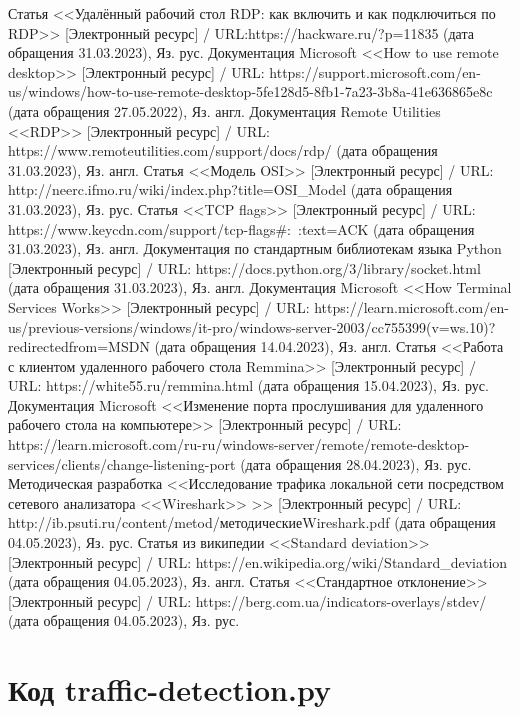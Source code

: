 \documentclass[bachelor, och, coursework]{SCWorks}
\begin{document}
  \begin{thebibliography}{15}
    Статья <<Удалённый рабочий стол RDP: как включить и как подключиться по RDP>> [Электронный ресурс] / URL:https://hackware.ru/?p=11835 (дата обращения 31.03.2023), Яз. рус.
    Документация Microsoft <<How to use remote desktop>> [Электронный ресурс] / URL: https://support.microsoft.com/en-us/windows/how-to-use-remote-desktop-5fe128d5-8fb1-7a23-3b8a-41e636865e8c (дата обращения 27.05.2022), Яз. англ.
    Документация Remote Utilities <<RDP>> [Электронный ресурс] / URL:  https://www.remoteutilities.com/support/docs/rdp/ (дата обращения 31.03.2023), Яз. англ.
    Статья <<Модель OSI>> [Электронный ресурс] / URL: http://neerc.ifmo.ru/wiki/index.php?title=OSI_Model (дата обращения 31.03.2023), Яз. рус.
    Статья <<TCP flags>> [Электронный ресурс] / URL: https://www.keycdn.com/support/tcp-flags\#:~:text=ACK
    (дата обращения 31.03.2023), Яз. англ.
    Документация по стандартным библиотекам языка Python [Электронный ресурс] / URL: https://docs.python.org/3/library/socket.html (дата обращения 31.03.2023), Яз. англ.
    Документация Microsoft <<How Terminal Services Works>> [Электронный ресурс] / URL:  https://learn.microsoft.com/en-us/previous-versions/windows/it-pro/windows-server-2003/cc755399(v=ws.10)?redirectedfrom=MSDN (дата обращения 14.04.2023), Яз. англ.
    Статья <<Работа с клиентом удаленного рабочего стола Remmina>> [Электронный ресурс] / URL: https://white55.ru/remmina.html
    (дата обращения 15.04.2023), Яз. рус.
    Документация Microsoft <<Изменение порта прослушивания для удаленного рабочего стола на компьютере>> [Электронный ресурс] / URL: https://learn.microsoft.com/ru-ru/windows-server/remote/remote-desktop-services/clients/change-listening-port
    (дата обращения 28.04.2023), Яз. рус.
    Методическая разработка <<Исследование трафика локальной сети посредством сетевого анализатора <<Wireshark>> >> [Электронный ресурс] / URL: http://ib.psuti.ru/content/metod/методическиеWireshark.pdf
    (дата обращения 04.05.2023), Яз. рус.
    Статья из википедии <<Standard deviation>> [Электронный ресурс] / URL: https://en.wikipedia.org/wiki/Standard\_deviation
    (дата обращения 04.05.2023), Яз. англ.
    Статья <<Стандартное отклонение>> [Электронный ресурс] / URL: https://berg.com.ua/indicators-overlays/stdev/
    (дата обращения 04.05.2023), Яз. рус.

  \end{thebibliography}

  \appendix

    \section{Код traffic-detection.py}
    \inputminted[fontsize=\footnotesize, linenos]{Python}{code/traffic-detection.py}
\end{document}
